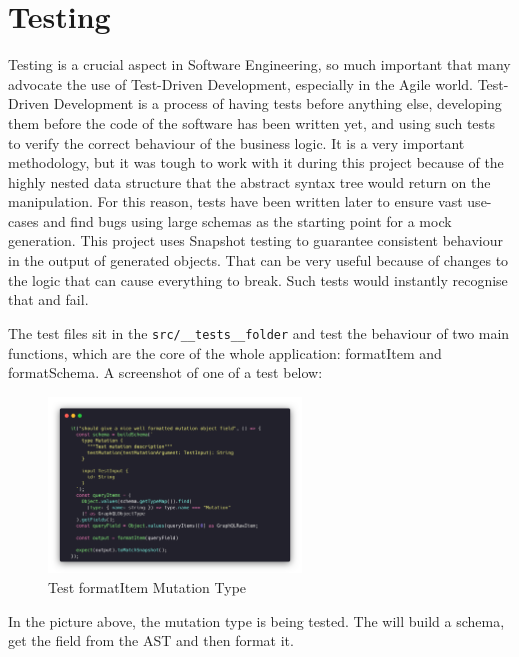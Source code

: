 
\section{Testing}
\label{s:Testing}
Testing is a crucial aspect in Software Engineering, so much important that many
advocate the use of Test-Driven Development, especially in the Agile world.
Test-Driven Development is a process of having tests before anything else,
developing them before the code of the software has been written yet, and using
such tests to verify the correct behaviour of the business logic. It is a very
important methodology, but it was tough to work with it during this project
because of the highly nested data structure that the abstract syntax tree would
return on the manipulation. For this reason, tests have been written later to
ensure vast use-cases and find bugs using large schemas as the starting point
for a mock generation. This project uses Snapshot testing to guarantee
consistent behaviour in the output of generated objects. That can be very useful
because of changes to the logic that can cause everything to break. Such tests
would instantly recognise that and fail.

The test files sit in the \texttt{src/\_\_tests\_\_folder} and test the
behaviour of two main functions, which are the core of the whole application:
formatItem and formatSchema. A screenshot of one of a test below:

\begin{figure}[H]
  \centering
  \includegraphics[width=0.6\textwidth]{figures/code/test1.png}
  \caption{Test formatItem Mutation Type}
  \label{f:test1}
\end{figure}

In the picture above, the mutation type is being tested. The will build a schema,
get the field from the AST and then format it.


